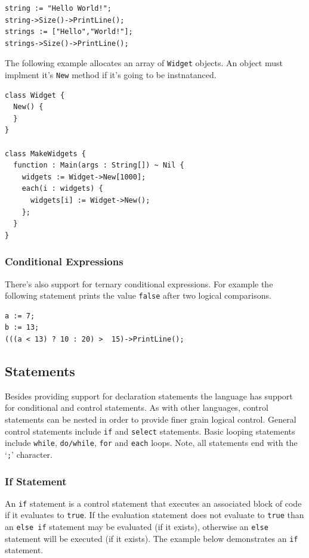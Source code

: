 \documentclass[11pt]{article}
\begin{document}
\begin{verbatim}
string := "Hello World!";
string->Size()->PrintLine();
strings := ["Hello","World!"];
strings->Size()->PrintLine();
\end{verbatim}

The following example allocates an array of \texttt{Widget} objects.  An object must
implment it's \texttt{New} method if it's going to be instnatanced.

\begin{verbatim}
class Widget {
  New() {
  }
}

class MakeWidgets {
  function : Main(args : String[]) ~ Nil {
    widgets := Widget->New[1000];
    each(i : widgets) {
      widgets[i] := Widget->New();
    };
  }
}
\end{verbatim}

\subsubsection{Conditional Expressions}
There's also support for ternary conditional expressions.  For example
the following statement prints the value \texttt{false} after two logical comparisons. 

\begin{verbatim}
a := 7;
b := 13;
(((a < 13) ? 10 : 20) >  15)->PrintLine();
\end{verbatim}

\subsection{Statements}
Besides providing support for declaration statements the language has
support for conditional and control statements.  As with other
languages, control statements can be nested in order to provide finer
grain logical control. General control statements include \texttt{if}
and \texttt{select} statements. Basic looping statements include
\texttt{while}, \texttt{do/while}, \texttt{for} and \texttt{each}
loops.  Note, all statements end with the `\texttt{;}' character.

\subsubsection{If Statement}

An \texttt{if} statement is a control statement that executes an
associated block of code if it evaluates to \texttt{true}.  If the
evaluation statement does not evaluate to \texttt{true} than an
\texttt{else if} statement may be evaluated (if it exists), otherwise
an \texttt{else} statement will be executed (if it exists).  The
example below demonstrates an \texttt{if} statement.
\end{document}
